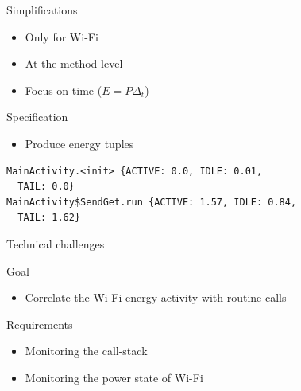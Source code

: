 \begin{frame}[fragile]{Simplifications}
\begin{itemize}
\item Only for Wi-Fi
\item At the method level
\item Focus on time ($E= P \Delta_t$)
\end{itemize}
\begin{block}{Specification}
\begin{itemize}
\item Produce energy tuples
\end{itemize}
\end{block}
\begin{lstlisting}
MainActivity.<init> {ACTIVE: 0.0, IDLE: 0.01,
  TAIL: 0.0}
MainActivity$SendGet.run {ACTIVE: 1.57, IDLE: 0.84,
  TAIL: 1.62}
\end{lstlisting}
\end{frame}
%
%
\begin{frame}{Technical challenges}
\begin{block}{Goal}
\begin{itemize}
\item \alert{Correlate} the Wi-Fi energy activity with routine calls
\end{itemize}
\end{block}
\begin{block}{Requirements}
\begin{itemize}
\item Monitoring the call-stack
\item Monitoring the power state of Wi-Fi
\end{itemize}
\end{block}
\end{frame}
